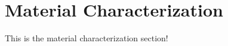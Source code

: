 \section{Material Characterization\label{methedology:customerDiscovery}}
This is the material characterization section!
